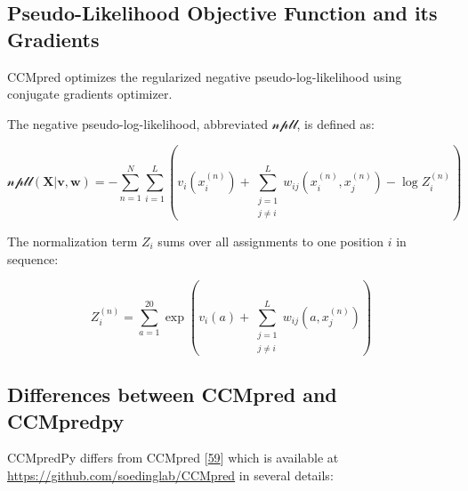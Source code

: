 \documentclass[12pt,a4paper,twoside]{book}
\renewcommand{\v}{\mathbf{v}}
\newcommand{\w}{\mathbf{w}}
\theoremstyle{definition}
\theoremstyle{definition}
\theoremstyle{remark}
\begin{document}
\subsection{Pseudo-Likelihood Objective Function and its
Gradients}\label{pseudo-likelihood-objective-function-and-its-gradients}

CCMpred optimizes the regularized negative pseudo-log-likelihood using
conjugate gradients optimizer.

The negative pseudo-log-likelihood, abbreviated \(\mathcal{npll}\), is
defined as:

\begin{equation}
  \mathcal{npll}(\mathbf{X} | \v,\w) =   - \sum_{n=1}^N \sum_{i=1}^L  \left(  v_i(x_i^{(n)}) + \sum_{\substack{j=1 \\ j \neq i}}^L w_{ij}(x_i^{(n)}, x_j^{(n)})  - \log Z_i^{(n)} \right)
\end{equation}

The normalization term \(Z_i\) sums over all assignments to one position
\(i\) in sequence:

\begin{equation}
  Z_i^{(n)} = \sum_{a=1}^{20} \exp \left( v_i(a) + \sum_{\substack{j=1 \\ j \neq i}}^L w_{ij}(a, x_j^{(n)}) \right)
\end{equation}

\subsection{Differences between CCMpred and
CCMpredpy}\label{diff-ccmpred-ccmpredpy}

CCMpredPy differs from CCMpred
{[}\protect\hyperlink{ref-Seemayer2014}{59}{]} which is available at
\url{https://github.com/soedinglab/CCMpred} in several details:
\end{document}
